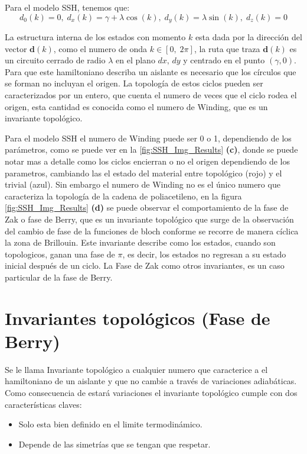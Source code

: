 Para el modelo SSH, tenemos que:
\begin{equation}
  d_0(k) = 0 ,\; d_x(k) = \gamma + \lambda \cos(k) , \; d_y(k) = \lambda \sin(k), \; d_z(k) = 0  
\end{equation}

La estructura interna de los estados con momento $k$ esta dada por la dirección del vector $\mathbf{d}(k)$, como el numero de onda $k  \in \left[ 0, \; 2\pi \right]$, la ruta que traza $\mathbf{d}(k)$ es un circuito cerrado de radio $\lambda$ en el plano $dx, \,dy$ y centrado en el punto $(\gamma, 0)$. Para que este hamiltoniano describa un aislante es necesario que los círculos que se forman no incluyan el origen\cite{Asboth2015}. La topología de estos ciclos pueden ser caracterizados por un entero, que cuenta el numero de veces que el ciclo rodea el origen, esta cantidad es conocida como el numero de Winding, que es un invariante topológico.

Para el modelo SSH el numero de Winding puede ser 0 o 1, dependiendo de los parámetros, como se puede ver en la \ref{fig:SSH_Img_Results} \textbf{(c)}, donde se puede notar mas a detalle como los ciclos encierran o no el origen dependiendo de los parametros, cambiando las el estado del material entre topológico (rojo) y el trivial (azul). Sin embargo el numero de Winding no es el único numero que caracteriza la topología de la cadena de poliacetileno, en la figura \ref{fig:SSH_Img_Results} \textbf{(d)} se puede observar el comportamiento de la fase de Zak o fase de Berry, que es un invariante topológico que surge de la observación del cambio de fase de la funciones de bloch conforme se recorre de manera cíclica la zona de Brillouin. Este invariante describe como los estados, cuando son topologicos, ganan una fase de $\pi$, es decir, los estados no regresan a su estado inicial después de un ciclo. La Fase de Zak como otros invariantes, es un caso particular de la fase de Berry.

\section{Invariantes topológicos (Fase de Berry)}

Se le llama Invariante topológico a cualquier numero que caracterice a el hamiltoniano de un aislante y que no cambie a través de variaciones adiabáticas. Como consecuencia de estará variaciones el invariante topológico cumple con dos características claves:
\begin{itemize}
    \item Solo esta bien definido en el limite termodinámico.
    \item Depende de las simetrías que se tengan que respetar.
\end{itemize}

